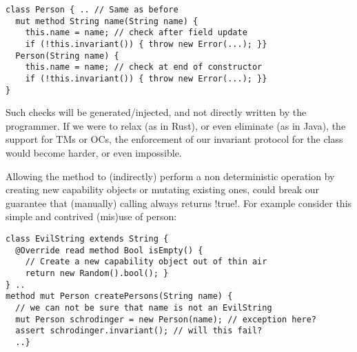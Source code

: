 \begin{lstlisting}
class Person { .. // Same as before
  mut method String name(String name) {
    this.name = name; // check after field update
    if (!this.invariant()) { throw new Error(...); }}
  Person(String name) {
    this.name = name; // check at end of constructor
    if (!this.invariant()) { throw new Error(...); }}
}
\end{lstlisting}
%

Such checks will be generated/injected, and not directly written by the programmer. If we were to relax (as in Rust), or even eliminate (as in Java), the support for TMs or OCs, the enforcement of our invariant protocol for the \Q@Person@ class would become harder, or even impossible. 

 Allowing the \Q@invariant@ method to (indirectly) perform a non deterministic operation by creating new capability objects or mutating existing ones, could break our guarantee that (manually) calling \Q@invariant@ always returns \Q!true!.
% 
For example consider this simple and contrived (mis)use of person:
\begin{lstlisting}[morekeywords={assert}]
class EvilString extends String {
  @Override read method Bool isEmpty() {
    // Create a new capability object out of thin air
    return new Random().bool(); }
} ..
method mut Person createPersons(String name) {
  // we can not be sure that name is not an EvilString
  mut Person schrodinger = new Person(name); // exception here?
  assert schrodinger.invariant(); // will this fail?
  ..}
\end{lstlisting}

